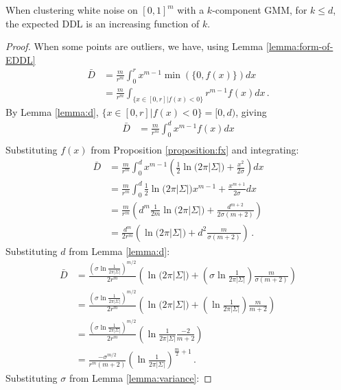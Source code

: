 \begin{lemma} \label{lemma:increasing-when-outliers}
When clustering white noise on $[0,1]^m$ with a $k$-component GMM, for $k \leq d$, the expected DDL is an increasing function of $k$. 
\end{lemma}
\begin{proof}
When some points are outliers, we have, using Lemma \ref{lemma:form-of-EDDL}
\begin{align*}
    \bar{D} &= \frac{m}{r^m}\int_0^r x^{m-1} \min(\{0,f(x)\}) dx \\
            &= \frac{m}{r^m}\int_{\{x \in [0,r] | f(x) < 0\}} r^{m-1} f(x) dx \,.
\end{align*}
By Lemma \ref{lemma:d}, $\{x \in [0,r] | f(x) < 0\} = [0,d)$, giving
\begin{align*}
     \bar{D} &= \frac{m}{r^m}\int_0^d x^{m-1} f(x) dx \\
\end{align*}
Substituting $f(x)$ from Proposition \ref{proposition:fx} and integrating:
\begin{align*}
    \bar{D} &= \frac{m}{r^m}\int_0^d x^{m-1} \left(\frac{1}{2} \ln{(2\pi |\Sigma|}) + \frac{x^2}{2\sigma}\right)  dx \\
            &= \frac{m}{r^m}\int_0^d \frac{1}{2} \ln{(2\pi |\Sigma|})x^{m-1}  + \frac{x^{m+1}}{2\sigma}  dx \\
            &= \frac{m}{r^m} \left(d^{m} \frac{1}{2m} \ln{(2\pi |\Sigma|}) + \frac{d^{m+2}}{2\sigma(m+2)} \right) \\ 
            &= \frac{d^{m}}{2r^m}  \left(\ln{(2\pi |\Sigma|}) + d^{2}\frac{m}{\sigma(m+2)} \right) \,.
\end{align*}
Substituting $d$ from Lemma \ref{lemma:d}:
\begin{align*}
     \bar{D} &= \frac{(\sigma \ln{\frac{1}{2\pi |\Sigma|}})^{m/2}}{2r^m}  \left(\ln{(2\pi |\Sigma|}) + (\sigma \ln{\frac{1}{2\pi |\Sigma|}})\frac{m}{\sigma(m+2)} \right) \\
            &= \frac{(\sigma \ln{\frac{1}{2\pi |\Sigma|}})^{m/2}}{2r^m}  \left(\ln{(2\pi |\Sigma|}) + (\ln{\frac{1}{2\pi |\Sigma|}})\frac{m}{m+2} \right) \\
            &= \frac{(\sigma \ln{\frac{1}{2\pi |\Sigma|}})^{m/2}}{2r^m}  \left(\ln{\frac{1}{2\pi |\Sigma|}}\frac{-2}{m+2} \right) \\
            &= \frac{-\sigma ^{m/2}}{r^m(m+2)}  \left(\ln{\frac{1}{2\pi |\Sigma|}} \right)^{\frac{m}{2}+1} \,.
\end{align*}
Substituting $\sigma$ from Lemma \ref{lemma:variance}:

\end{proof}
